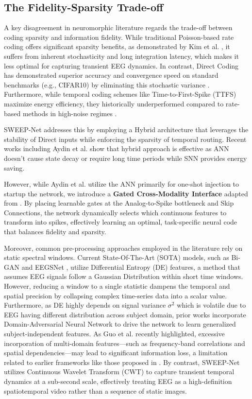 \documentclass[conference]{IEEEtran}
\begin{document}
\subsection{The Fidelity-Sparsity Trade-off}
A key disagreement in neuromorphic literature regards the trade-off between coding sparsity and information fidelity. While traditional Poisson-based rate coding offers significant sparsity benefits, as demonstrated by Kim et al. \cite{Kim2022}, it suffers from inherent stochasticity and long integration latency, which makes it less optimal for capturing transient EEG dynamics. In contrast, Direct Coding has demonstrated superior accuracy and convergence speed on standard benchmarks (e.g., CIFAR10) by eliminating this stochastic variance \cite{Kim2022}. Furthermore, while temporal coding schemes like Time-to-First-Spike (TTFS) maximize energy efficiency, they historically underperformed compared to rate-based methods in high-noise regimes \cite{Oh2021}. 

SWEEP-Net addresses this by employing a Hybrid architecture that leverages the stability of Direct inputs while enforcing the sparsity of temporal routing. Recent works including Aydin et al. \cite{Aydin2024} show that hybrid approach is effective as ANN doesn't cause state decay or require long time periods while SNN provides energy saving. 

However, while Aydin et al. \cite{Aydin2024} utilize the ANN primarily for one-shot injection to startup the network, we introduce a \textbf{Gated Cross-Modality Interface} adapted from \cite{Oktay2018}. By placing learnable gates at the Analog-to-Spike bottleneck and Skip Connections, the network dynamically selects which continuous features to transform into spikes, effectively learning an optimal, task-specific neural code that balances fidelity and sparsity.

Moreover, common pre-processing approaches employed in the literature rely on static spectral windows. Current State-Of-The-Art (SOTA) models, such as Bi-GAN \cite{Niaki2025} and EEGSNet \cite{Shi2025}, utilize Differential Entropy (DE) features, a method that assumes EEG signals follow a Gaussian Distribution within short time windows. However, reducing a window to a single statistic dampens the temporal and spatial precision by collapsing complex time-series data into a scalar value. Furthermore, as DE highly depends on signal variance $\sigma^2$ which is volatile due to EEG having different distribution across subject domain, prior works incorporate Domain-Adversarial Neural Network \cite{Sicilia2023} to drive the network to learn generalized subject-independent features. As Guo et al. \cite{Guo2025} recently highlighted, excessive incorporation of multi-domain features---such as frequency-band correlations and spatial dependencies---may lead to significant information loss, a limitation related to earlier frameworks like those proposed in \cite{Nie2011, Shi2013}. By contrast, SWEEP-Net utilizes Continuous Wavelet Transform (CWT) to capture transient temporal dynamics at a sub-second scale, effectively treating EEG as a high-definition spatiotemporal video rather than a sequence of static images.
\end{document}
